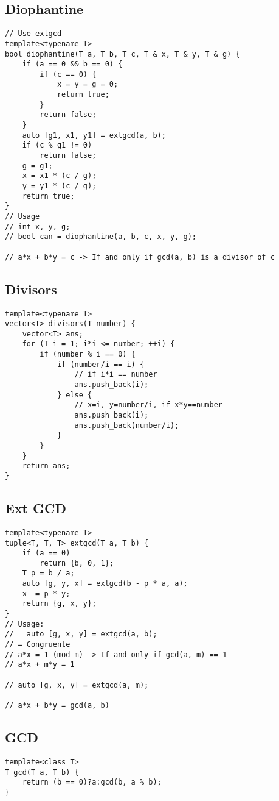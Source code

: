\documentclass[10pt,letterpaper,twocolumn,twosided]{article}
\begin{document}
\subsection{Diophantine}
\begin{lstlisting}
// Use extgcd
template<typename T>
bool diophantine(T a, T b, T c, T & x, T & y, T & g) {
    if (a == 0 && b == 0) {
        if (c == 0) {
            x = y = g = 0;
            return true;
        }
        return false;
    }
    auto [g1, x1, y1] = extgcd(a, b);
    if (c % g1 != 0)
        return false;
    g = g1;
    x = x1 * (c / g);
    y = y1 * (c / g);
    return true;
}
// Usage
// int x, y, g;
// bool can = diophantine(a, b, c, x, y, g);

// a*x + b*y = c -> If and only if gcd(a, b) is a divisor of c
\end{lstlisting}

\subsection{Divisors}
\begin{lstlisting}
template<typename T>
vector<T> divisors(T number) {
    vector<T> ans;
    for (T i = 1; i*i <= number; ++i) {
        if (number % i == 0) {
            if (number/i == i) {
                // if i*i == number
                ans.push_back(i);
            } else {
                // x=i, y=number/i, if x*y==number
                ans.push_back(i);
                ans.push_back(number/i);
            }
        }
    }
    return ans;
}
\end{lstlisting}

\subsection{Ext GCD}
\begin{lstlisting}
template<typename T>
tuple<T, T, T> extgcd(T a, T b) {
    if (a == 0)
        return {b, 0, 1};
    T p = b / a;
    auto [g, y, x] = extgcd(b - p * a, a);
    x -= p * y;
    return {g, x, y};
}
// Usage:
//   auto [g, x, y] = extgcd(a, b);
// = Congruente
// a*x = 1 (mod m) -> If and only if gcd(a, m) == 1
// a*x + m*y = 1

// auto [g, x, y] = extgcd(a, m);

// a*x + b*y = gcd(a, b) 
\end{lstlisting}

\subsection{GCD}
\begin{lstlisting}
template<class T>
T gcd(T a, T b) {
    return (b == 0)?a:gcd(b, a % b);
}
\end{lstlisting}
\end{document}
